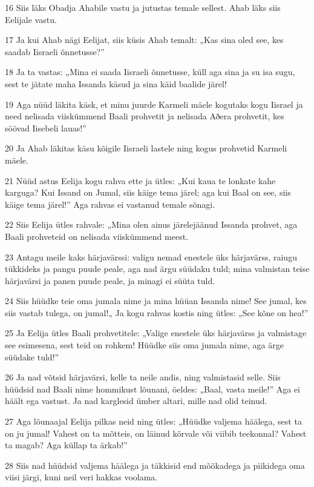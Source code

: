 \par 16 Siis läks Obadja Ahabile vastu ja jutustas temale sellest. Ahab läks siis Eelijale vastu.
\par 17 Ja kui Ahab nägi Eelijat, siis küsis Ahab temalt: „Kas sina oled see, kes saadab Iisraeli õnnetusse?”
\par 18 Ja ta vastas: „Mina ei saada Iisraeli õnnetusse, küll aga sina ja su isa sugu, sest te jätate maha Issanda käsud ja sina käid baalide järel!
\par 19 Aga nüüd läkita käsk, et minu juurde Karmeli mäele kogutaks kogu Iisrael ja need nelisada viiskümmend Baali prohvetit ja nelisada Aðera prohvetit, kes söövad Iisebeli lauas!”
\par 20 Ja Ahab läkitas käsu kõigile Iisraeli lastele ning kogus prohvetid Karmeli mäele.
\par 21 Nüüd astus Eelija kogu rahva ette ja ütles: „Kui kaua te lonkate kahe karguga? Kui Issand on Jumal, siis käige tema järel; aga kui Baal on see, siis käige tema järel!” Aga rahvas ei vastanud temale sõnagi.
\par 22 Siis Eelija ütles rahvale: „Mina olen ainus järelejäänud Issanda prohvet, aga Baali prohveteid on nelisada viiskümmend meest.
\par 23 Antagu meile kaks härjavärssi: valigu nemad enestele üks härjavärss, raiugu tükkideks ja pangu puude peale, aga nad ärgu süüdaku tuld; mina valmistan teise härjavärsi ja panen puude peale, ja minagi ei süüta tuld.
\par 24 Siis hüüdke teie oma jumala nime ja mina hüüan Issanda nime! See jumal, kes siis vastab tulega, on jumal!„ Ja kogu rahvas kostis ning ütles: „See kõne on hea!”
\par 25 Ja Eelija ütles Baali prohvetitele: „Valige enestele üks härjavärss ja valmistage see esimesena, sest teid on rohkem! Hüüdke siis oma jumala nime, aga ärge süüdake tuld!”
\par 26 Ja nad võtsid härjavärsi, kelle ta neile andis, ning valmistasid selle. Siis hüüdsid nad Baali nime hommikust lõunani, öeldes: „Baal, vasta meile!” Aga ei häält ega vastust. Ja nad karglesid ümber altari, mille nad olid teinud.
\par 27 Aga lõunaajal Eelija pilkas neid ning ütles: „Hüüdke valjema häälega, sest ta on ju jumal! Vahest on ta mõtteis, on läinud kõrvale või viibib teekonnal? Vahest ta magab? Aga küllap ta ärkab!”
\par 28 Siis nad hüüdsid valjema häälega ja täkkisid end mõõkadega ja piikidega oma viisi järgi, kuni neil veri hakkas voolama.
